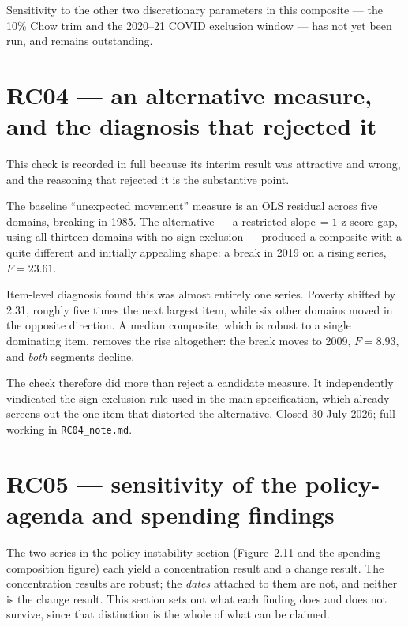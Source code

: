 Sensitivity to the other two discretionary parameters in this composite --- the 10\% Chow trim and
the 2020--21 COVID exclusion window --- has not yet been run, and remains outstanding.

\section{RC04 --- an alternative measure, and the diagnosis that rejected it}

This check is recorded in full because its interim result was attractive and wrong, and the
reasoning that rejected it is the substantive point.

The baseline ``unexpected movement'' measure is an OLS residual across five domains, breaking in
1985. The alternative --- a restricted slope\,$=1$ z-score gap, using all thirteen domains with no
sign exclusion --- produced a composite with a quite different and initially appealing shape: a
break in 2019 on a rising series, $F=23.61$.

Item-level diagnosis found this was almost entirely one series. Poverty shifted by 2.31, roughly
five times the next largest item, while six other domains moved in the opposite direction. A median
composite, which is robust to a single dominating item, removes the rise altogether: the break moves
to 2009, $F=8.93$, and \emph{both} segments decline.

The check therefore did more than reject a candidate measure. It independently vindicated the
sign-exclusion rule used in the main specification, which already screens out the one item that
distorted the alternative. Closed 30 July 2026; full working in \texttt{RC04\_note.md}.

\section{RC05 --- sensitivity of the policy-agenda and spending findings}

The two series in the policy-instability section (Figure~2.11 and the spending-composition figure)
each yield a concentration result and a change result. The concentration results are robust; the
\emph{dates} attached to them are not, and neither is the change result. This section sets out what
each finding does and does not survive, since that distinction is the whole of what can be claimed.

